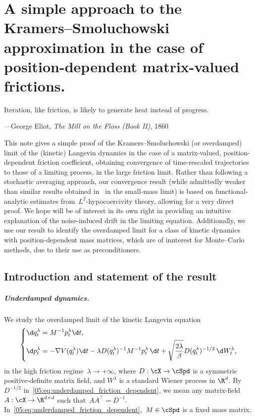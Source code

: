\chapter{A simple approach to the Kramers--Smoluchowski approximation in the case of position-dependent matrix-valued frictions.}
\label{chap:overdamped}
\epigraph{Iteration, like friction, is likely to generate heat instead of progress.}{---George Eliot, \textit{The Mill on the Floss (Book II)}, 1860}

\begin{chapterabstract}
    This note gives a simple proof of the Kramers--Smoluchowski (or overdamped) limit of the (kinetic) Langevin dynamics in the case of a matrix-valued, position-dependent friction coefficient,
    obtaining convergence of time-rescaled trajectories to those of a limiting process, in the large friction limit.
    Rather than following a stochastic averaging approach, our convergence result (while admittedly weaker than similar results obtained in~\cite{HMVW15} in the small-mass limit) is based on functional-analytic estimates from~$L^2$-hypocoercivity theory, allowing for a very direct proof.
    We hope will be of interest in its own right in providing an intuitive explanation of the noise-induced drift in the limiting equation.
    Additionally, we use our result to identify the overdamped limit for a class of kinetic dynamics with position-dependent mass matrices, which are of innterest for Monte--Carlo methods, due to their use as preconditioners.
\end{chapterabstract}

\section{Introduction and statement of the result}
\label{05:sec:intro}

\paragraph{Underdamped dynamics.}
We study the overdamped limit of the kinetic Langevin equation
\begin{equation}
    \label{05:eq:underdamped_friction_dependent}
    \left\{
    \begin{aligned}
            \d q_t^\lambda &= M^{-1}p_t^\lambda \d t,\\
            \d p_t^\lambda &= -\nabla V(q_t^\lambda) \d t - \lambda D(q_t^\lambda)^{-1}M^{-1}p_t^\lambda\,\d t + \sqrt{\frac{2\lambda}{\beta}}D(q_t^\lambda)^{-1/2}\,\d W_t^\lambda,
        \end{aligned}
    \right.
\end{equation}
in the high friction regime~$\lambda\to+\infty$, where $D:\cX\to \cSpd$ is a symmetric positive-definite matrix field, and $W^\lambda$ is a standard Wiener process in $\R^d$. By~$D^{-1/2}$ in~\eqref{05:eq:underdamped_friction_dependent}, we mean any matrix-field $A:\cX\to\R^{d\times d}$ such that~$AA^\top=D^{-1}$. In~\eqref{05:eq:underdamped_friction_dependent},~$M\in \cSpd$ is a fixed mass matrix.

